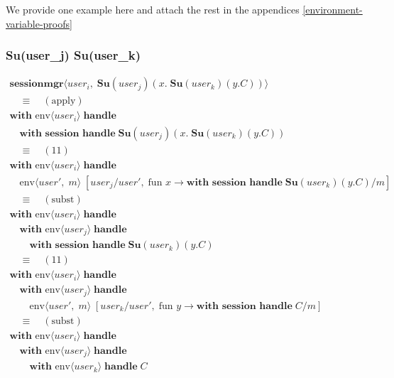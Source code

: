 \documentclass[logo,bsc,singlespacing,parskip]{infthesis}
\begin{document}
We provide one example here and attach the rest in the appendices \ref{environment-variable-proofs}
\subsubsection*{Su(user\_j) Su(user\_k)}
\[
\begin{array}{l}
\textbf{sessionmgr} \langle \mathit{user}_i,\; \textbf{Su}(\mathit{user}_j)(x.\;\textbf{Su}(\mathit{user}_k)(y.C)) \rangle \\[5pt]

\quad\equiv\quad (\text{apply}) \\[5pt]
\textbf{with }\text{}\text{env} \langle \mathit{user}_i \rangle\; \textbf{handle} \\
\quad\textbf{with session handle}\; \textbf{Su}(\mathit{user}_j)(x.\;\textbf{Su}(\mathit{user}_k)(y.C)) \\[5pt]

\quad\equiv\quad (11) \\[5pt]
\textbf{with }\text{env} \langle \mathit{user}_i \rangle\; \textbf{handle} \\
\quad\textbf{}\text{env} \langle \mathit{user}',\; m \rangle\; [\mathit{user}_j/\mathit{user}',\; \text{fun } x \rightarrow \textbf{with session handle}\; \textbf{Su}(\mathit{user}_k)(y.C)/m] \\[5pt]

\quad\equiv\quad (\text{subst}) \\[5pt]
\textbf{with }\text{env} \langle \mathit{user}_i \rangle\; \textbf{handle} \\
\quad\textbf{with }\text{env} \langle \mathit{user}_j \rangle\; \textbf{handle} \\
\qquad\textbf{with session handle}\; \textbf{Su}(\mathit{user}_k)(y.C) \\[5pt]

\quad\equiv\quad (11) \\[5pt]
\textbf{with }\text{env} \langle \mathit{user}_i \rangle\; \textbf{handle} \\
\quad\textbf{with }\text{env} \langle \mathit{user}_j \rangle\; \textbf{handle} \\
\qquad\textbf{}\text{env} \langle \mathit{user}',\; m \rangle\; [\mathit{user}_k/\mathit{user}',\; \text{fun } y \rightarrow \textbf{with session handle}\; C/m] \\[5pt]

\quad\equiv\quad (\text{subst}) \\[5pt]
\textbf{with }\text{env} \langle \mathit{user}_i \rangle\; \textbf{handle} \\
\quad\textbf{with }\text{env} \langle \mathit{user}_j \rangle\; \textbf{handle} \\
\qquad\textbf{with }\text{env} \langle \mathit{user}_k \rangle\; \textbf{handle}\; C
\end{array}
\]
\end{document}
